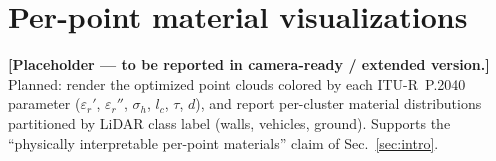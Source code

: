 \section{Per-point material visualizations}
\label{app:materials}

\textbf{[Placeholder --- to be reported in camera-ready / extended version.]} Planned: render the optimized point clouds colored by each ITU-R~P.2040 parameter ($\varepsilon_r'$, $\varepsilon_r''$, $\sigma_h$, $l_c$, $\tau$, $d$), and report per-cluster material distributions partitioned by LiDAR class label (walls, vehicles, ground). Supports the ``physically interpretable per-point materials'' claim of Sec.~\ref{sec:intro}.
